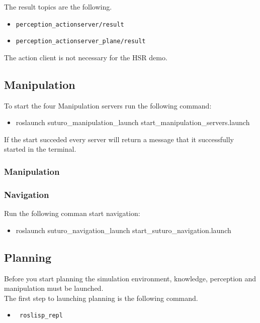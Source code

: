 \documentclass[main.tex]{subfiles}
\begin{document}
The result topics are the following.
\begin{itemize}
\item \begin{verbatim}
perception_actionserver/result
\end{verbatim}
\item \begin{verbatim}
perception_actionserver_plane/result
\end{verbatim}
\end{itemize}

The action client is not necessary for the HSR demo.
	
	\subsection{Manipulation}
	To start the four Manipulation servers run the following command:
	\begin{itemize}
		\item roslaunch suturo\_manipulation\_launch start\_manipulation\_servers.launch
	\end{itemize}
	If the start succeded every server will return a message that it successfully started in the terminal.
	\subsubsection{Manipulation}
	
	\subsubsection{Navigation}
	Run the following comman start navigation:
	\begin{itemize}
		\item roslaunch suturo\_navigation\_launch start\_suturo\_navigation.launch
	\end{itemize}
	
	\subsection{Planning}
	Before you start planning the simulation environment, knowledge, perception and manipulation must be launched.\\
	The first step to launching planning is the following command.
	\begin{itemize}
\item \begin{verbatim} roslisp_repl \end{verbatim} 
\end{itemize}
\end{document}
